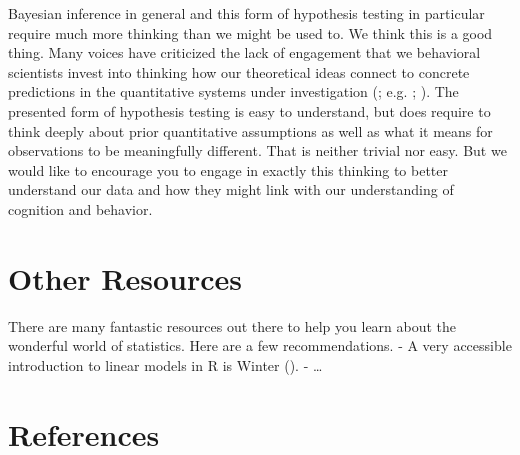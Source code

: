 \documentclass[
  doc,
  floatsintext,
  longtable,
  nolmodern,
  notxfonts,
  notimes,
  colorlinks=true,linkcolor=blue,citecolor=blue,urlcolor=blue]{apa7}
\begin{document}
Bayesian inference in general and this form of hypothesis testing in
particular require much more thinking than we might be used to. We think
this is a good thing. Many voices have criticized the lack of engagement
that we behavioral scientists invest into thinking how our theoretical
ideas connect to concrete predictions in the quantitative systems under
investigation (; e.g. ;
). The
presented form of hypothesis testing is easy to understand, but does
require to think deeply about prior quantitative assumptions as well as
what it means for observations to be meaningfully different. That is
neither trivial nor easy. But we would like to encourage you to engage
in exactly this thinking to better understand our data and how they
might link with our understanding of cognition and behavior.

\section{Other Resources}\label{other-resources}

There are many fantastic resources out there to help you learn about the
wonderful world of statistics. Here are a few recommendations. - A very
accessible introduction to linear models in R is Winter
(). - \ldots{}

\section{References}\label{references}
\end{document}
